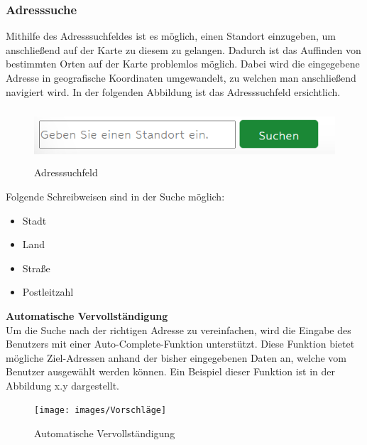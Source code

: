 \subsubsection{Adresssuche}
Mithilfe des Adresssuchfeldes ist es möglich, einen Standort einzugeben, um anschließend auf der Karte zu diesem zu gelangen. Dadurch ist das Auffinden von bestimmten Orten auf der Karte problemlos möglich. Dabei wird die eingegebene Adresse in geografische Koordinaten umgewandelt, zu welchen man anschließend navigiert wird. In der folgenden Abbildung ist das Adresssuchfeld ersichtlich.
\begin{figure}[h]
	\centering
	\includegraphics[height=2cm,width=15cm]{images/Adresssuchfeld}
	\caption{Adresssuchfeld}
	\label{fig:Adresssuchfeld}
\end{figure}

\newpage
Folgende Schreibweisen sind in der Suche möglich:
\begin{itemize}
	\item Stadt 
	\item Land
	\item Straße 
	\item Postleitzahl 
\end{itemize}


\textbf{Automatische Vervollständigung} \\
Um die Suche nach der richtigen Adresse zu vereinfachen, wird die Eingabe des Benutzers mit einer Auto-Complete-Funktion unterstützt. Diese Funktion bietet mögliche Ziel-Adressen anhand der bisher eingegebenen Daten an, welche vom Benutzer ausgewählt werden können. Ein Beispiel dieser Funktion ist in der Abbildung x.y dargestellt. 
\begin{figure}[h]
	\centering
	\texttt{[image: images/Vorschläge]}
	\caption{Automatische Vervollständigung}
	\label{fig:Automatische Vervollständigung}
\end{figure}
\\

